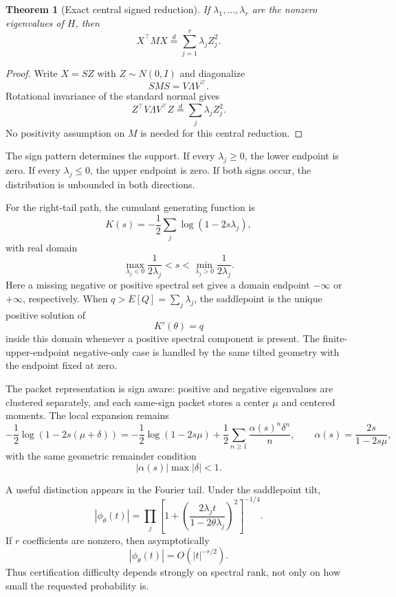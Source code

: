 \documentclass[11pt]{article}
\newtheorem{theorem}{Theorem}[section]
\theoremstyle{definition}
\theoremstyle{remark}
\begin{document}
\begin{theorem}[Exact central signed reduction]\label{claim:final-2-2}
If $\lambda_1,\ldots,\lambda_r$ are the nonzero eigenvalues of $H$, then
\[
\boxed{
X^\top M X
\overset d=
\sum_{j=1}^r\lambda_jZ_j^2.
}
\]
\end{theorem}

\begin{proof}
Write $X=SZ$ with $Z\sim N(0,I)$ and diagonalize
\[
SMS=V\Lambda V^\top.
\]
Rotational invariance of the standard normal gives
\[
Z^\top V\Lambda V^\top Z
\overset d=
\sum_j\lambda_jZ_j^2.
\]
No positivity assumption on $M$ is needed for this central reduction.
\end{proof}

The sign pattern determines the support.  If every $\lambda_j\ge0$, the lower
endpoint is zero.  If every $\lambda_j\le0$, the upper endpoint is zero.  If
both signs occur, the distribution is unbounded in both directions.

For the right-tail path, the cumulant generating function is
\[
K(s)
=
-\frac12\sum_j\log(1-2s\lambda_j),
\]
with real domain
\[
\boxed{
\max_{\lambda_j<0}\frac{1}{2\lambda_j}
< s <
\min_{\lambda_j>0}\frac{1}{2\lambda_j}.
}
\]
Here a missing negative or positive spectral set gives a domain endpoint
\(-\infty\) or \(+\infty\), respectively.
When $q>E[Q]=\sum_j\lambda_j$, the saddlepoint is the unique positive solution
of
\[
K'(\theta)=q
\]
inside this domain whenever a positive spectral component is present.  The
finite-upper-endpoint negative-only case is handled by the same tilted
geometry with the endpoint fixed at zero.

The packet representation is sign aware: positive and negative eigenvalues are
clustered separately, and each same-sign packet stores a center $\mu$ and
centered moments.  The local expansion remains
\[
-\frac12\log(1-2s(\mu+\delta))
=
-\frac12\log(1-2s\mu)
+
\frac12\sum_{n\ge1}
\frac{\alpha(s)^n\delta^n}{n},
\qquad
\alpha(s)=\frac{2s}{1-2s\mu},
\]
with the same geometric remainder condition
\[
|\alpha(s)|\max|\delta|<1.
\]

A useful distinction appears in the Fourier tail.  Under the saddlepoint tilt,
\[
\left|\phi_\theta(t)\right|
=
\prod_j
\left[
1+
\left(
\frac{2\lambda_j t}{1-2\theta\lambda_j}
\right)^2
\right]^{-1/4}.
\]
If $r$ coefficients are nonzero, then asymptotically
\[
|\phi_\theta(t)|=O(|t|^{-r/2}).
\]
Thus certification difficulty depends strongly on spectral rank, not only on
how small the requested probability is.
\end{document}
